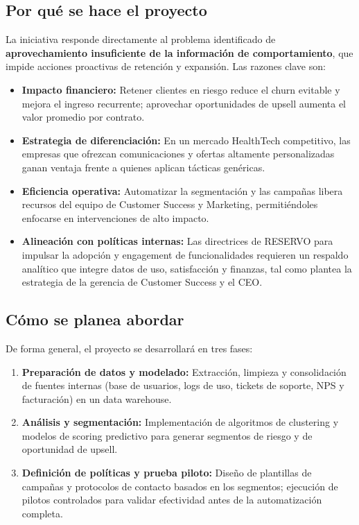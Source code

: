 \subsection{Por qué se hace el proyecto}
La iniciativa responde directamente al problema identificado de \textbf{aprovechamiento insuficiente de la información de comportamiento}, que impide acciones proactivas de retención y expansión. Las razones clave son:
\begin{itemize}
  \item \textbf{Impacto financiero:} Retener clientes en riesgo reduce el churn evitable y mejora el ingreso recurrente; aprovechar oportunidades de upsell aumenta el valor promedio por contrato.
  \item \textbf{Estrategia de diferenciación:} En un mercado HealthTech competitivo, las empresas que ofrezcan comunicaciones y ofertas altamente personalizadas ganan ventaja frente a quienes aplican tácticas genéricas.
  \item \textbf{Eficiencia operativa:} Automatizar la segmentación y las campañas libera recursos del equipo de Customer Success y Marketing, permitiéndoles enfocarse en intervenciones de alto impacto.
  \item \textbf{Alineación con políticas internas:} Las directrices de RESERVO para impulsar la adopción y engagement de funcionalidades requieren un respaldo analítico que integre datos de uso, satisfacción y finanzas, tal como plantea la estrategia de la gerencia de Customer Success y el CEO.
\end{itemize}

\subsection{Cómo se planea abordar}
De forma general, el proyecto se desarrollará en tres fases:
\begin{enumerate}
  \item \textbf{Preparación de datos y modelado:} Extracción, limpieza y consolidación de fuentes internas (base de usuarios, logs de uso, tickets de soporte, NPS y facturación) en un data warehouse.
  \item \textbf{Análisis y segmentación:} Implementación de algoritmos de clustering y modelos de scoring predictivo para generar segmentos de riesgo y de oportunidad de upsell.
  \item \textbf{Definición de políticas y prueba piloto:} Diseño de plantillas de campañas y protocolos de contacto basados en los segmentos; ejecución de pilotos controlados para validar efectividad antes de la automatización completa.
\end{enumerate}


